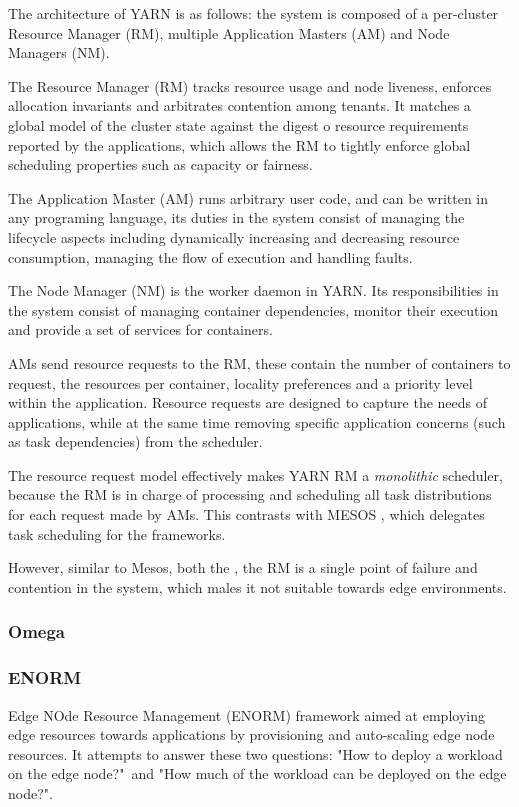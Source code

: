 The architecture of YARN is as follows: the system is composed of a per-cluster Resource Manager (RM), multiple Application Masters (AM) and Node Managers (NM). 

The Resource Manager (RM) tracks resource usage and node liveness, enforces allocation invariants and arbitrates contention among tenants. It matches a global model of the cluster state against the digest o resource requirements reported by the applications, which allows the RM to tightly enforce global scheduling properties such as capacity or fairness.

The Application Master (AM) runs arbitrary user code, and can be written in any programing language, its duties in the system consist of managing the lifecycle aspects including dynamically increasing and decreasing resource consumption, managing the flow of execution and handling faults. 

The Node Manager (NM) is the worker daemon in YARN. Its responsibilities in the system consist of managing container dependencies, monitor their execution and provide a set of services for containers. 

AMs send resource requests to the RM, these contain the number of containers to request, the resources per container, locality preferences and a priority level within the application. Resource requests are designed to capture the needs of applications, while at the same time removing specific application concerns (such as task dependencies) from the scheduler.

The resource request model effectively makes YARN RM a \textit{monolithic} scheduler, because the RM is in charge of processing and scheduling all task distributions for each request made by AMs. This contrasts with MESOS \cite{hindman2011mesos}, which delegates task scheduling for the frameworks. 

However, similar to Mesos, both the , the RM is a single point of failure and contention in the system, which males it not suitable towards edge environments.

\subsubsection{Omega}

\subsubsection{ENORM}

Edge NOde Resource Management \cite{wang2017enorm} (ENORM) framework aimed at employing edge resources towards applications by provisioning and auto-scaling edge node resources. It attempts to answer these two questions: "How to deploy a workload on the edge node?"\ and "How much of the workload can be deployed on the edge node?".

